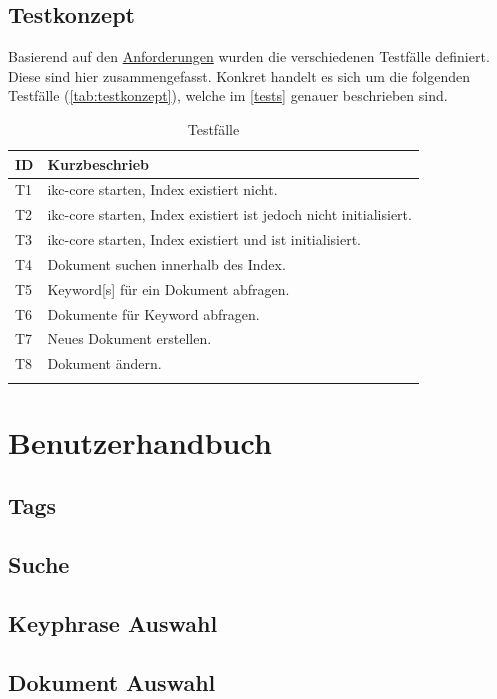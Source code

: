 \subsection{Testkonzept}
Basierend auf den \hyperref[anforderungen]{Anforderungen} wurden die verschiedenen Testfälle definiert. Diese sind hier zusammengefasst. Konkret handelt es sich um die folgenden Testfälle (\autoref{tab:testkonzept}), welche im \autoref{tests} genauer beschrieben sind.

\begin{longtable}{|p{1cm} | P{6cm} |}
  \hline
    ID & Kurzbeschrieb \\\hline
    T1 & \gls{ikc-core} starten, Index existiert nicht.\\\hline
    T2 & \gls{ikc-core} starten, Index existiert ist jedoch nicht initialisiert.\\\hline
    T3 & \gls{ikc-core} starten, Index existiert und ist initialisiert.\\\hline
    T4 & Dokument suchen innerhalb des Index.\\\hline
    T5 & \gls{Keyword}[s] für ein Dokument abfragen.\\\hline
    T6 & Dokumente für \gls{Keyword} abfragen.\\\hline
    T7 & Neues Dokument erstellen.\\\hline
    T8 & Dokument ändern.\\\hline
    \caption{Testfälle}
  \label{tab:testkonzept}
\end{longtable}

\section{Benutzerhandbuch}\label{tutorial}

\subsection{Tags}

\subsection{Suche}

\subsection{Keyphrase Auswahl}

\subsection{Dokument Auswahl}

